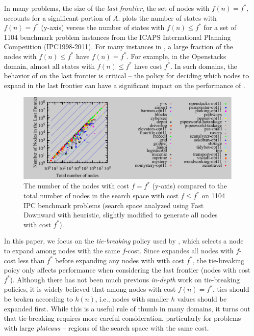 In many problems, the size of the \emph{last frontier}, the set of nodes with $f(n)=f^*$, accounts for a significant portion of $A$.
 plots the number of states with $f(n) = f^*$ (y-axis)
versus the number of states with $f(n) \leq f^*$
for a set of 1104 benchmark problem instances from the ICAPS International Planning Competition (IPC1998-2011).
For many instances in ,  a large fraction of the nodes with $f(n) \leq f^*$ have $f(n)=f^*$.
For example, in the Openstacks domain, almost all states with $f(n) \leq f^*$ have cost $f^*$.
In such domains, the behavior of \astar on the last frontier is critical -- the policy for deciding which nodes to expand in the last frontier can have a significant impact on the performance of \astar.

\begin{figure}[htb]
 \centering {} 
 \includegraphics{tables/aaai16-frontier/aaai16prelim3/lmcut_frontier_noh-front.pdf}
 \caption{
 The number of the nodes with cost $f=f^*$ (y-axis) compared to the
 total number of nodes in the search space with cost $f\leq f^*$ on 1104 IPC benchmark problems
(search space analyzed using Fast Downward with \lmcut heuristic, slightly modified to generate all nodes with cost $f^*$).}
\label{fig:plateau-noh}
\end{figure}

In this paper, we focus on the \emph{tie-breaking} policy used by \astar, which selects a node to expand among nodes with the same $f$-cost.
Since \astar expandes all nodes with $f$-cost less than $f^*$ before expanding any nodes with with cost $f^*$, 
the tie-breaking poicy only affects performance when considering the last frontier (nodes with cost $f^*$).
Although there has not been much previous \emph{in-depth} work on tie-breaking policies,
it is widely believed that among nodes with cost $f(n) = f^*$, ties should be broken according to $h(n)$, i.e., nodes with smaller $h$ values should be expanded first.
While this is a useful rule of thumb in many domains,
it turns out that tie-breaking requires more careful consideration, particularly for problems with large \emph{plateaus} -- regions of the search space with the same cost.

